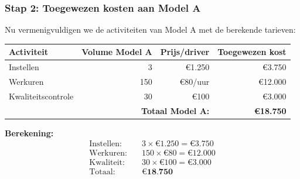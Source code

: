 \documentclass[a4paper,11pt]{article}
\begin{document}
\begin{oefenblok}
    \subsubsection*{Stap 2: Toegewezen kosten aan Model A}

    Nu vermenigvuldigen we de activiteiten van Model A met de berekende tarieven:

    \begin{center}
        \begin{tabular}{|l|r|r|r|}
            \hline
            \textbf{Activiteit}                            & \textbf{Volume Model A} & \textbf{Prijs/driver} & \textbf{Toegewezen kost} \\
            \hline
            Instellen                                      & 3                       & €1.250                & €3.750                   \\
            \hline
            Werkuren                                       & 150                     & €80/uur               & €12.000                  \\
            \hline
            Kwaliteitscontrole                             & 30                      & €100                  & €3.000                   \\
            \hline
            \multicolumn{3}{|r|}{\textbf{Totaal Model A:}} & \textbf{€18.750}                                                           \\
            \hline
        \end{tabular}
    \end{center}

    \textbf{Berekening:}
    \begin{align*}
        \text{Instellen:} \quad & 3 \times €1.250 = €3.750 \\
        \text{Werkuren:} \quad  & 150 \times €80 = €12.000 \\
        \text{Kwaliteit:} \quad & 30 \times €100 = €3.000  \\
        \hline
        \text{Totaal:} \quad    & \textbf{€18.750}
    \end{align*}

    \begin{center}
\end{center}
\end{oefenblok}
\end{document}
